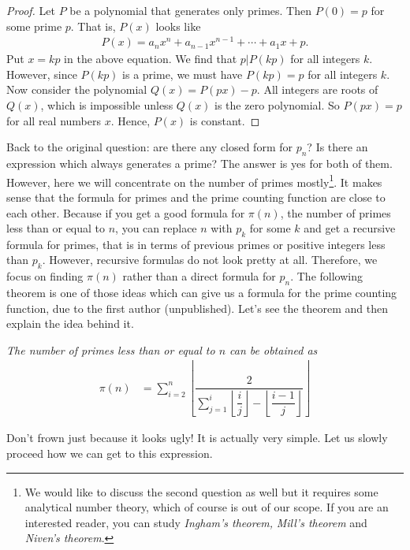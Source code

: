 \documentclass{subfiles}
\begin{document}
			\begin{proof}
				Let $P$ be a polynomial that generates only primes. Then $P(0)=p$ for some prime $p$. That is, $P(x)$ looks like
					\begin{align*}
					P(x)=a_nx^n+a_{n-1}x^{n-1} + \cdots + a_1x + p.
					\end{align*}
				Put $x=kp$ in the above equation. We find that $p|P(kp)$ for all integers $k$. However, since $P(kp)$ is a prime, we must have $P(kp)=p$ for all integers $k$. Now consider the polynomial $Q(x)=P(px)-p$. All integers are roots of $Q(x)$, which is impossible unless $Q(x)$ is the zero polynomial. So $P(px)=p$ for all real numbers $x$. Hence, $P(x)$ is constant.
			\end{proof}
		Back to the original question: are there any closed form for $p_n$? Is there an expression which always generates a prime? The answer is yes for both of them. However, here we will concentrate on the number of primes mostly\footnote{We would like to discuss the second question as well but it requires some analytical number theory, which of course is out of our scope. If you are an interested reader, you can study \textit{Ingham's theorem,}\cite{ingham} \textit{Mill's theorem}\cite{mills} and \textit{Niven's theorem}\cite{niven}.}. It makes sense that the formula for primes and the prime counting function are close to each other. Because if you get a good formula for $\pi(n)$, the number of primes less than or equal to $n$, you can replace $n$ with $p_k$ for some $k$ and get a recursive formula for primes, that is in terms of previous primes or positive integers less than $p_k$. However, recursive formulas do not look pretty at all. Therefore, we focus on finding $\pi(n)$ rather than a direct formula for $p_n$. The following theorem is one of those ideas which can give us a formula for the prime counting function, due to the first author (unpublished). Let's see the theorem and then explain the idea behind it.
			\begin{theorem}\slshape
				The number of primes less than or equal to $n$ can be obtained as
					\begin{align*}
						\pi(n) & = 
							\sum_{i=2}^{n}\left\lfloor\dfrac{2}{\sum_{j=1}^{i}\left\lfloor\dfrac{i}{j}\right\rfloor-\left\lfloor\dfrac{i-1}{j}\right\rfloor}\right\rfloor
					\end{align*}
			\end{theorem}
		Don't frown just because it looks ugly! It is actually very simple. Let us slowly proceed how we can get to this expression. 
\end{document}
